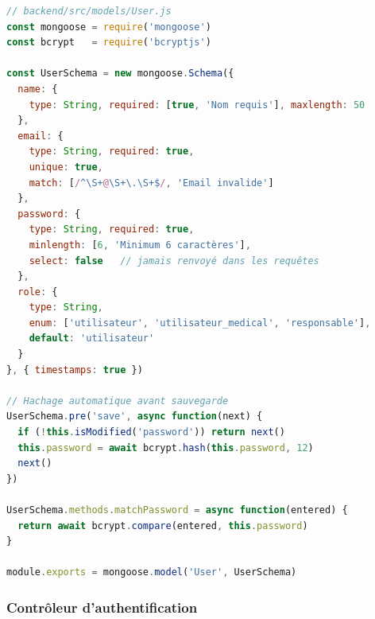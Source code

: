 \begin{lstlisting}[language=JavaScript, caption={Modèle Mongoose User avec hachage bcrypt}, label={lst:user_model}]
// backend/src/models/User.js
const mongoose = require('mongoose')
const bcrypt   = require('bcryptjs')

const UserSchema = new mongoose.Schema({
  name: {
    type: String, required: [true, 'Nom requis'], maxlength: 50
  },
  email: {
    type: String, required: true,
    unique: true,
    match: [/^\S+@\S+\.\S+$/, 'Email invalide']
  },
  password: {
    type: String, required: true,
    minlength: [6, 'Minimum 6 caractères'],
    select: false   // jamais renvoyé dans les requêtes
  },
  role: {
    type: String,
    enum: ['utilisateur', 'utilisateur_medical', 'responsable'],
    default: 'utilisateur'
  }
}, { timestamps: true })

// Hachage automatique avant sauvegarde
UserSchema.pre('save', async function(next) {
  if (!this.isModified('password')) return next()
  this.password = await bcrypt.hash(this.password, 12)
  next()
})

UserSchema.methods.matchPassword = async function(entered) {
  return await bcrypt.compare(entered, this.password)
}

module.exports = mongoose.model('User', UserSchema)
\end{lstlisting}

\subsubsection{Contrôleur d'authentification}

